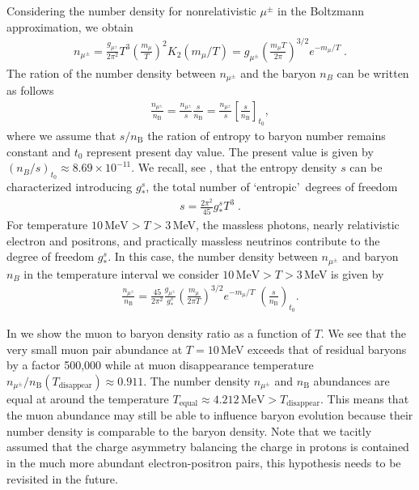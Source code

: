 Considering the number density for nonrelativistic $\mu^\pm$ in the Boltzmann approximation, we obtain
\begin{align}\label{nmupm}
n_{\mu^\pm}=\frac{g_{\mu^\pm}}{2\pi^2}T^3\left(\frac{m_\mu}{T}\right)^2 K_2(m_\mu/T)=g_{\mu^\pm}\left(\frac{m_\mu T}{2\pi}\right)^{3/2}e^{-{m_\mu}/{T}}\;. 
\end{align}
The ration of the number density between $n_{\mu^\pm}$ and the  baryon $n_B$ can be written as follows
\begin{align}
\frac{n_{\mu^\pm}}{n_\mathrm{B}}=\frac{n_{\mu^\pm}}{s}\frac{s}{n_\mathrm{B}}=
\frac{n_{\mu^\pm}}{s}\left[\frac{s}{n_\mathrm{B}}\right]_{t_0},
\end{align}
where we assume that $s/n_\mathrm{B}$ the ration of entropy to baryon number remains constant and $t_0$ represent present day value. The present value is given by $(n_B/s)_{t_0}\approx8.69\times10^{-11}$. We recall, see , that the entropy density $s$ can be characterized introducing $g^s_\ast$, the total number of \lq entropic\rq\ degrees of freedom
\begin{align}%
s=\frac{2\pi^2}{45}g^s_\ast T^3\;.
\end{align}
For temperature $10\,\mathrm{MeV} >T>3 $\,MeV, the massless photons, nearly relativistic electron and positrons, and practically massless neutrinos contribute to the degree of freedom $g^s_\ast$.  In this case, the number density between $n_{\mu^\pm}$ and baryon $n_B$ in the temperature interval we consider $10\,\mathrm{MeV} >T>3 $\,MeV is given by
\begin{align}\label{nmuperbF} 
\frac{n_{\mu^\pm}}{n_\mathrm{B}}=\frac{45}{2\pi^2}\frac{g_{\mu^\pm}}{g^s_\ast}\left(\frac{m_\mu}{2\pi T}\right)^{3/2}e^{-{m_\mu}/{T}}\;\left(\frac{s}{n_\mathrm{B}}\right)_{\!t_0}.
\end{align}

In  we show the muon to baryon density ratio  as a function of $T$. We see that the very small muon pair abundance at $T=10$\,MeV exceeds that of residual baryons by a factor 500,000 while at muon disappearance temperature $n_{\mu^\pm}/n_\mathrm{B}(T_\mathrm{disappear})\approx0.911$. The number density $n_{\mu^\pm}$ and $n_\mathrm{B}$  abundances are equal at around the temperature $T_\mathrm{equal}\approx4.212\,\mathrm{MeV} >  T_\mathrm{disappear}$.  This means that the muon abundance may still be able to influence baryon evolution because their number density is comparable to the baryon density. Note that we tacitly assumed that the charge asymmetry balancing the charge in protons is contained in the much more abundant electron-positron pairs, this hypothesis needs to be revisited in the future. %

